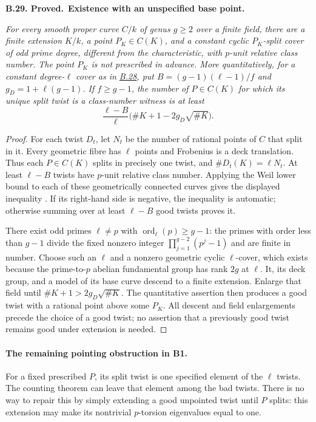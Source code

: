 \documentclass[11pt,a4paper]{article}
\newenvironment{claim}[3]{\par\medskip\noindent\hypertarget{#1}{\textbf{#1. #2.}}\ \textbf{#3.}\par\nopagebreak\smallskip\begingroup\itshape}{\endgroup\par\smallskip}
\newcommand{\statementref}[1]{\hyperlink{#1}{#1}}
\begin{document}
\begin{claim}{B.29}{Proved}{Existence with an unspecified base point}
For every smooth proper curve $C/k$ of genus $g\ge2$ over a
finite field, there are a finite extension $K/k$, a point
$P_K\in C(K)$, and a constant cyclic $P_K$-split cover of odd
prime degree, different from the characteristic, with $p$-unit
relative class number. The point $P_K$ is not prescribed in
advance. More quantitatively, for a constant degree-$\ell$ cover
as in \statementref{B.28}, put
$B=(g-1)(\ell-1)/f$ and $g_D=1+\ell(g-1)$. If $f\ge g-1$, the
number of $P\in C(K)$ for which its unique split twist is a
class-number witness is at least
\[
       \frac{\ell-B}{\ell}
             \bigl(\#K+1-2g_D\sqrt{\#K}\bigr).
\]
\end{claim}
\begin{proof}
For each twist $D_t$, let $N_t$ be the number of rational points
of $C$ that split in it. Every geometric fibre has $\ell$ points
and Frobenius is a deck translation. Thus each $P\in C(K)$
splits in precisely one twist, and
$\#D_t(K)=\ell N_t$. At least $\ell-B$ twists have $p$-unit
relative class number. Applying the Weil lower bound to each
of these geometrically connected curves gives the displayed
inequality \cite[Theorem 1.6 and formula 1.5.1]{WeilCurves}.
If its right-hand side is negative, the inequality is automatic;
otherwise summing over at least $\ell-B$ good twists proves it.

There exist odd primes $\ell\ne p$ with
$\operatorname{ord}_\ell(p)\ge g-1$: the primes with order less
than $g-1$ divide the fixed nonzero integer
$\prod_{j=1}^{g-2}(p^j-1)$ and are finite in number.
Choose such an $\ell$ and a nonzero geometric cyclic
$\ell$-cover, which exists because the prime-to-$p$ abelian
fundamental group has rank $2g$ at $\ell$.
It, its deck group, and a model of its base curve descend to a
finite extension. Enlarge that field until
$\#K+1>2g_D\sqrt{\#K}$. The quantitative assertion then produces
a good twist with a rational point above some $P_K$.
All descent and field enlargements precede the choice of a good
twist; no assertion that a previously good twist remains good
under extension is needed.
\end{proof}

\paragraph{The remaining pointing obstruction in B1.}
For a fixed prescribed $P$, its split twist is one specified
element of the $\ell$ twists. The counting theorem can leave
that element among the bad twists. There is no way to repair
this by simply extending a good unpointed twist until $P$
splits: this extension may make its nontrivial $p$-torsion
eigenvalues equal to one.
\end{document}
